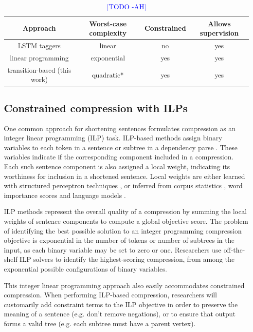 \documentclass[11pt,a4paper]{article}
\newcommand{\ahcomment}[1]{\textcolor{blue}{[#1 -AH]}}
\begin{document}
\begin{table}[htb!]
\begin{tabular}{cccc}
\textbf{Approach} & \textbf{Worst-case complexity} & \textbf{Constrained} & \textbf{Allows supervision} \\ \hline
LSTM taggers      & linear              & no     &    yes      \\   
linear programming              & exponential         & yes    &    yes   \\
transition-based (this work)       & quadratic*           & yes    &      yes   \\
\end{tabular}
\caption{\ahcomment{TODO}}
\end{table}

\subsection{Constrained compression with ILPs}

One common approach for shortening sentences formulates compression as an integer linear programming (ILP) task. ILP-based methods assign binary variables to each token in a sentence \cite{clarke2008global} or subtree in a dependency parse \cite{filippova2008dependency}. These variables indicate if the corresponding component included in a compression. Each such sentence component is also assigned a local weight, indicating its worthiness for inclusion in a shortened sentence. Local weights are either learned with structured perceptron techniques \cite{filippova2013overcoming}, or inferred from corpus statistics \cite{filippova2008dependency}, word importance scores and language models \cite{clarke2008global}.

ILP methods represent the overall quality of a compression by summing the local weights of sentence components to compute a global objective score.  The problem of identifying the best possible solution to an integer programming compression objective is exponential in the number of tokens or number of subtrees in the input, as each binary variable may be set to zero or one. Researchers use off-the-shelf ILP solvers to identify the highest-scoring compression, from among the exponential possible configurations of binary variables.

This integer linear programming approach also easily accommodates constrained compression. When performing ILP-based compression, researchers will customarily add constraint terms to the ILP objective in order to preserve the meaning of a sentence (e.g. don't remove negations), or to ensure that output forms a valid tree (e.g. each subtree must have a parent vertex).
\end{document}

